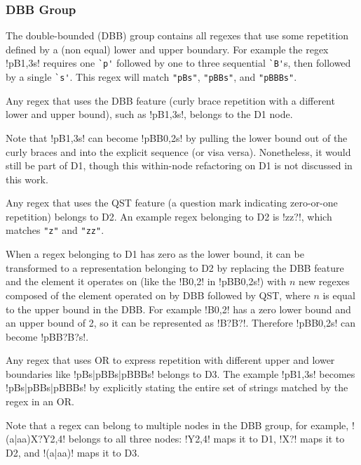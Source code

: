 \subsubsection{DBB Group}
The double-bounded (DBB) group contains all regexes that use some repetition defined by a (non equal) lower and upper boundary.  For example the regex \cverb!pB{1,3}s! requires one \verb!`p'! followed by one to three sequential \verb!`B'!s, then followed by a single \verb!`s'!.  This regex will match \verb!"pBs"!, \verb!"pBBs"!, and \verb!"pBBBs"!.

\begin{description}  \itemsep -1pt
\item[D1:] Any regex that uses the DBB feature (curly brace repetition with a different lower and upper bound), such as \cverb!pB{1,3}s!, belongs to the D1 node.

Note that \cverb!pB{1,3}s! can become \cverb!pBB{0,2}s! by pulling the lower bound out of the curly braces and into the explicit sequence (or visa versa). Nonetheless, it would still be part of D1, though this within-node refactoring on D1 is not discussed in this work.
\item[D2:] Any regex that uses the QST feature (a question mark indicating zero-or-one repetition) belongs to D2. An example regex belonging to D2 is \cverb!zz?!, which matches \verb!"z"! and \verb!"zz"!.

When a regex belonging to D1 has zero as the lower bound, it can be transformed to a representation belonging to D2 by replacing the DBB feature and the element it operates on (like the \cverb!B{0,2}! in \cverb!pBB{0,2}s!) with $n$ new regexes composed of the element operated on by DBB followed by QST, where $n$ is equal to the upper bound in the DBB.  For example \cverb!B{0,2}! has a zero lower bound and an upper bound of 2, so it can be represented as \cverb!B?B?!.  Therefore \cverb!pBB{0,2}s! can become \cverb!pBB?B?s!.
\item[D3:] Any regex that uses OR to express repetition with different upper and lower boundaries like \cverb!pBs|pBBs|pBBBs! belongs to D3.  The example \cverb!pB{1,3}s! becomes \cverb!pBs|pBBs|pBBBs! by explicitly stating the entire set of strings matched by the regex in an OR.
\end{description}

Note that a regex can belong to multiple nodes in the DBB group, for example, \cverb!(a|aa)X?Y{2,4}! belongs to all three nodes: \cverb!Y{2,4}! maps it to D1, \cverb!X?! maps it to D2, and \cverb!(a|aa)! maps it to D3.

